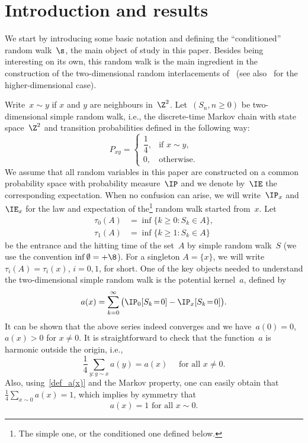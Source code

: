 \section{Introduction and results}\label{s_introres}

We start by introducing some basic notation and defining the ``conditioned'' random walk~$\s$, the main object of study in this paper. Besides being interesting on its own, this random walk is the main ingredient in the construction of the two-dimensional random interlacements of~\cite{CP16,CPV16} (see also~\cite{CT12,DRS14,SLT,Szn10} for the higher-dimensional case).

Write~$x\sim y$ if $x$ and $y$ are neighbours in~$\Z^2$. Let~$(S_n, n\geq 0)$ be two-dimensional simple random walk, i.e., the discrete-time Markov chain with state space~$\Z^2$ and transition probabilities defined in the following way:
\begin{equation}\label{def_S}
P_{xy} =
\begin{cases}
\dfrac{1}{4}, & \text{if }x\sim y,\\[0.6em]
0, & \text{otherwise}.
\end{cases}
\end{equation}
We assume that all random variables in this paper are constructed on a common probability space with probability measure~$\IP$ and we denote by~$\IE$ the corresponding expectation. When no confusion can arise, we will write~$\IP_x$ and~$\IE_x$ for the law and expectation of the\footnote{The simple one, or the conditioned one defined below.} random walk started from~$x$. Let
\begin{align}
\tau_0(A) &= \inf\{k\geq 0: S_k\in A\} \label{entrance_t},\\
\tau_1(A) &= \inf\{k\geq 1: S_k\in A\} \label{hitting_t}
\end{align}
be the entrance and the hitting time of the set~$A$ by simple random walk~$S$ (we use the convention $\inf \emptyset = +\8$). For a singleton $A=\{x\}$, we will write $\tau_i(A)=\tau_i(x)$, $i=0,1$, for short. One of the key objects needed to understand the two-dimensional simple random walk is the potential kernel~$a$, defined by
\begin{equation}\label{def_a(x)}
a(x) = \sum_{k=0}^\infty\big(\IP_0[S_k\!=\!0]-\IP_x[S_k\!=\!0]\big).
\end{equation}
It can be shown that the above series indeed converges and we have~$a(0)=0$, $a(x)>0$ for $x\neq 0$. It is straightforward to check that the function~$a$ is harmonic outside the origin, i.e.,
\begin{equation}\label{a_harm}
\frac{1}{4}\sum_{y: y\sim x}a(y) = a(x) \quad \text{ for all } x\neq 0.
\end{equation}
Also, using~\eqref{def_a(x)} and the Markov property, one can easily obtain that $\frac{1}{4}\sum_{x\sim 0}a(x)=1$, which implies by symmetry that
\begin{equation}\label{a(x)=1}
a(x)=1 \text{ for all }x\sim 0.
\end{equation}

